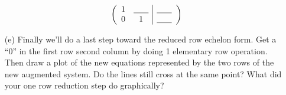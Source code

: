 \begin{problem}
\begin{enumerate}
            \begin{minipage}{0.3\columnwidth}
            \[ \left( \begin{array}{cc|c} 1 &
                        \underline{\hspace{0.25in}} &  \underline{\hspace{0.25in}} \\  0 &
                        1 &  \underline{\hspace{0.25in}}
                \end{array} \right) \]
            \end{minipage}
            \begin{minipage}{0.6\columnwidth}
            \begin{center}
            \end{center}
            \end{minipage}
        \item[(e)] Finally we'll do a last step toward the reduced row echelon form.  Get a
            ``0''
            in the first row second column by doing 1 elementary row operation. Then
            draw a plot of the new equations represented by the two rows of the new augmented
            system.  Do the lines still cross at the same point? What did your one row
            reduction step do graphically?


\end{enumerate}
\end{problem}
